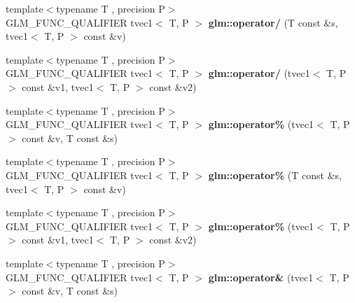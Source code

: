 \begin{DoxyCompactItemize}
\item 
\hypertarget{namespaceglm_a0d2b4d02e687816580ff7db2d48aea7a}{{\footnotesize template$<$typename T , precision P$>$ }\\G\-L\-M\-\_\-\-F\-U\-N\-C\-\_\-\-Q\-U\-A\-L\-I\-F\-I\-E\-R tvec1$<$ T, P $>$ {\bfseries glm\-::operator/} (T const \&s, tvec1$<$ T, P $>$ const \&v)}\label{namespaceglm_a0d2b4d02e687816580ff7db2d48aea7a}

\item 
\hypertarget{namespaceglm_adfaadf561e7e396410919ec1b2d55c46}{{\footnotesize template$<$typename T , precision P$>$ }\\G\-L\-M\-\_\-\-F\-U\-N\-C\-\_\-\-Q\-U\-A\-L\-I\-F\-I\-E\-R tvec1$<$ T, P $>$ {\bfseries glm\-::operator/} (tvec1$<$ T, P $>$ const \&v1, tvec1$<$ T, P $>$ const \&v2)}\label{namespaceglm_adfaadf561e7e396410919ec1b2d55c46}

\item 
\hypertarget{namespaceglm_aadc7004b135c45db47c9dd411d7934c9}{{\footnotesize template$<$typename T , precision P$>$ }\\G\-L\-M\-\_\-\-F\-U\-N\-C\-\_\-\-Q\-U\-A\-L\-I\-F\-I\-E\-R tvec1$<$ T, P $>$ {\bfseries glm\-::operator\%} (tvec1$<$ T, P $>$ const \&v, T const \&s)}\label{namespaceglm_aadc7004b135c45db47c9dd411d7934c9}

\item 
\hypertarget{namespaceglm_aaf2b927a422d7cccba0acc4765f9d376}{{\footnotesize template$<$typename T , precision P$>$ }\\G\-L\-M\-\_\-\-F\-U\-N\-C\-\_\-\-Q\-U\-A\-L\-I\-F\-I\-E\-R tvec1$<$ T, P $>$ {\bfseries glm\-::operator\%} (T const \&s, tvec1$<$ T, P $>$ const \&v)}\label{namespaceglm_aaf2b927a422d7cccba0acc4765f9d376}

\item 
\hypertarget{namespaceglm_a2de72c33a685ffa2e78ebad4ae9f4e2b}{{\footnotesize template$<$typename T , precision P$>$ }\\G\-L\-M\-\_\-\-F\-U\-N\-C\-\_\-\-Q\-U\-A\-L\-I\-F\-I\-E\-R tvec1$<$ T, P $>$ {\bfseries glm\-::operator\%} (tvec1$<$ T, P $>$ const \&v1, tvec1$<$ T, P $>$ const \&v2)}\label{namespaceglm_a2de72c33a685ffa2e78ebad4ae9f4e2b}

\item 
\hypertarget{namespaceglm_af611feaef6b3c0cc97fc9a0a7610f78a}{{\footnotesize template$<$typename T , precision P$>$ }\\G\-L\-M\-\_\-\-F\-U\-N\-C\-\_\-\-Q\-U\-A\-L\-I\-F\-I\-E\-R tvec1$<$ T, P $>$ {\bfseries glm\-::operator\&} (tvec1$<$ T, P $>$ const \&v, T const \&s)}\label{namespaceglm_af611feaef6b3c0cc97fc9a0a7610f78a}


\end{DoxyCompactItemize}
